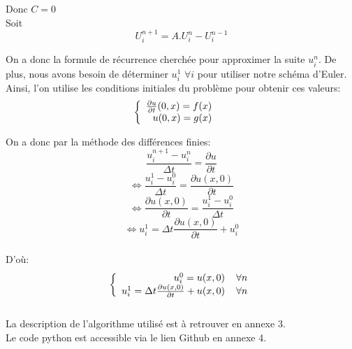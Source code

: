 Donc $C = 0$\\

Soit
\begin{equation*}
\boxed{
U^{n+1}_i = A.U^{n}_i - U^{n-1}_i}
\end{equation*}

On a donc la formule de récurrence cherchée pour approximer la suite $u^n_i$.
\newline
\newline
De plus, nous avons besoin de déterminer $u^1_i$ $\forall i$ pour utiliser notre schéma d'Euler. Ainsi, l'on utilise les conditions initiales du problème pour obtenir ces valeurs:
\begin{equation*}
\left \{
\begin{array}{rcl}
\frac{\partial u}{\partial t} (0,x) = f(x)\hspace*{4 mm}\\
 u(0,x) = g(x) \hspace*{4 mm} \\
\end{array}
\right.
\end{equation*}

On a donc par la méthode des différences finies:
\begin{equation*}
\frac{u^{n+1}_{i} - u^{n}_{i}}{\Delta t} = \frac{\partial u}{\partial t}
\end{equation*}
\begin{equation*}
\Leftrightarrow \frac{u^{1}_{i} - u^{0}_{i}}{\Delta t} = \frac{\partial u(x,0)}{\partial t}
\end{equation*}
\begin{equation*}
\Leftrightarrow \frac{\partial u(x,0)}{\partial t} = \frac{u^{1}_{i} - u^{0}_{i}}{\Delta t}
\end{equation*}
\begin{equation*}
\Leftrightarrow u^{1}_{i} = \Delta t \frac{\partial u(x,0)}{\partial t} + u^{0}_{i}
\end{equation*}\\
D'où:
\begin{equation*}
\left \{
\begin{array}{rcl}
u^0_i = u(x,0) \hspace*{4 mm} \forall n\\
u^1_i = \Delta t \frac{\partial u(x,0)}{\partial t} + u(x,0) \hspace*{4 mm} \forall n\\
\end{array}
\right.
\end{equation*}
\\
La description de l'algorithme utilisé est à retrouver en annexe 3.\\ Le code python est accessible via le lien Github en annexe 4.

